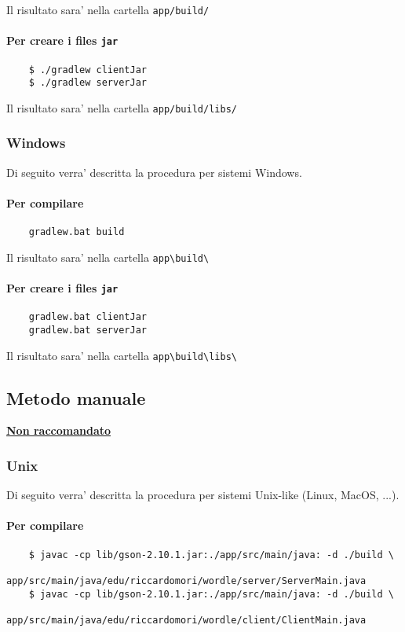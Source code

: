 Il risultato sara' nella cartella \texttt{app/build/}

\paragraph{Per creare i files \texttt{jar}}
\begin{verbatim}
	$ ./gradlew clientJar
	$ ./gradlew serverJar
\end{verbatim}

Il risultato sara' nella cartella \texttt{app/build/libs/}

\medskip
\subsubsection{Windows}
Di seguito verra' descritta la procedura per sistemi Windows.

\paragraph{Per compilare}
\begin{verbatim}
	gradlew.bat build
\end{verbatim}

Il risultato sara' nella cartella \texttt{app\textbackslash build\textbackslash}

\paragraph{Per creare i files \texttt{jar}}
\begin{verbatim}
	gradlew.bat clientJar
	gradlew.bat serverJar
\end{verbatim}

Il risultato sara' nella cartella \texttt{app\textbackslash build\textbackslash libs\textbackslash}

\bigskip
\bigskip
\hypertarget{manual}{}
\subsection{Metodo manuale}

\underline{\textbf{Non raccomandato}}

\subsubsection{Unix}
Di seguito verra' descritta la procedura per sistemi Unix-like (Linux, MacOS, ...).

\paragraph{Per compilare}
\begin{verbatim}
	$ javac -cp lib/gson-2.10.1.jar:./app/src/main/java: -d ./build \ 
	    app/src/main/java/edu/riccardomori/wordle/server/ServerMain.java
	$ javac -cp lib/gson-2.10.1.jar:./app/src/main/java: -d ./build \
	    app/src/main/java/edu/riccardomori/wordle/client/ClientMain.java
\end{verbatim}

